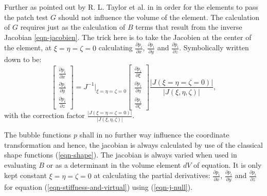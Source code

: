 Further as pointed out by R. L. Taylor et al. in \cite{incomp2} in
order for the elements to pass the patch test $G$ should not influence
the volume of the element. The calculation of $G$ requires just as the
calculation of $B$ terms that result from the inverse Jacobian
\ref{eqn-jacobien}. The trick here is to take the Jacobien at the
center of the element, at $\xi=\eta=\zeta=0$ calculating
$\frac{\partial p_i}{\partial x}$, $\frac{\partial p_i}{\partial y}$
and $\frac{\partial p_i}{\partial z}$.
Symbolically written down to be:
\begin{equation}
  \left[\begin{array}{c}
      \frac{\partial p_i}{\partial x} \\
      \frac{\partial p_i}{\partial y} \\
      \frac{\partial p_i}{\partial z}
    \end{array}\right]
  =
  J^{-1}|_{\xi=\eta=\zeta=0}
  \left[\begin{array}{c}
      \frac{\partial p_i}{\partial \xi} \\
      \frac{\partial p_i}{\partial \eta} \\
      \frac{\partial p_i}{\partial \zeta}
    \end{array}\right]
  \frac{|J(\xi=\eta=\zeta=0)|}{|J(\xi,\eta,\zeta)|},
  \label{eqn-j-null}
\end{equation}
with the correction factor $\frac{|J(\xi=\eta=\zeta=0)|}{|J(\xi,\eta,\zeta)|}$.

The bubble functions $p$ shall in no further way influence the coordinate
transformation and hence, the jacobian is
always calculated by use of the classical shape functions
(\ref{eqn-shape}). The jacobian is always varied when used
in evaluating $B$ or as a determinant in the volume element $dV$ of
equation. It is only kept constant $\xi=\eta=\zeta=0$ at calculating the partial
derivatives:
$\frac{\partial p_i}{\partial x}$, $\frac{\partial p_i}{\partial y}$ and
$\frac{\partial p_i}{\partial z}$ for equation  
(\ref{eqn-stiffness-and-virtual}) using (\ref{eqn-j-null}).

